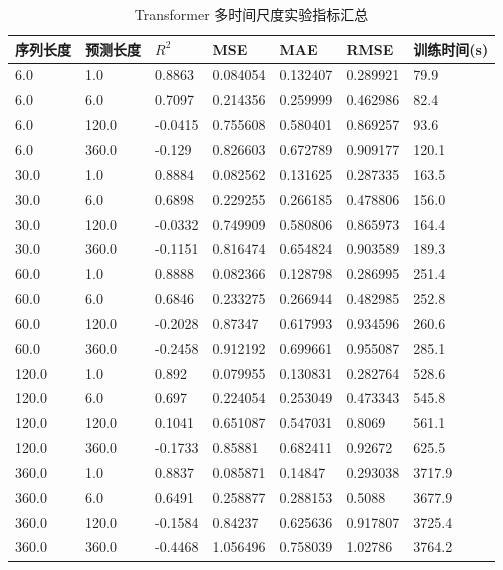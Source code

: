 \begin{table}[htbp]
\centering
\caption{Transformer 多时间尺度实验指标汇总}
\label{tab:transformer-metrics}
\begin{tabular}{lllllll}
\hline
序列长度 & 预测长度 & $R^2$ & MSE & MAE & RMSE & 训练时间(s) \\
\hline
6.0 & 1.0 & 0.8863 & 0.084054 & 0.132407 & 0.289921 & 79.9 \\
6.0 & 6.0 & 0.7097 & 0.214356 & 0.259999 & 0.462986 & 82.4 \\
6.0 & 120.0 & -0.0415 & 0.755608 & 0.580401 & 0.869257 & 93.6 \\
6.0 & 360.0 & -0.129 & 0.826603 & 0.672789 & 0.909177 & 120.1 \\
30.0 & 1.0 & 0.8884 & 0.082562 & 0.131625 & 0.287335 & 163.5 \\
30.0 & 6.0 & 0.6898 & 0.229255 & 0.266185 & 0.478806 & 156.0 \\
30.0 & 120.0 & -0.0332 & 0.749909 & 0.580806 & 0.865973 & 164.4 \\
30.0 & 360.0 & -0.1151 & 0.816474 & 0.654824 & 0.903589 & 189.3 \\
60.0 & 1.0 & 0.8888 & 0.082366 & 0.128798 & 0.286995 & 251.4 \\
60.0 & 6.0 & 0.6846 & 0.233275 & 0.266944 & 0.482985 & 252.8 \\
60.0 & 120.0 & -0.2028 & 0.87347 & 0.617993 & 0.934596 & 260.6 \\
60.0 & 360.0 & -0.2458 & 0.912192 & 0.699661 & 0.955087 & 285.1 \\
120.0 & 1.0 & 0.892 & 0.079955 & 0.130831 & 0.282764 & 528.6 \\
120.0 & 6.0 & 0.697 & 0.224054 & 0.253049 & 0.473343 & 545.8 \\
120.0 & 120.0 & 0.1041 & 0.651087 & 0.547031 & 0.8069 & 561.1 \\
120.0 & 360.0 & -0.1733 & 0.85881 & 0.682411 & 0.92672 & 625.5 \\
360.0 & 1.0 & 0.8837 & 0.085871 & 0.14847 & 0.293038 & 3717.9 \\
360.0 & 6.0 & 0.6491 & 0.258877 & 0.288153 & 0.5088 & 3677.9 \\
360.0 & 120.0 & -0.1584 & 0.84237 & 0.625636 & 0.917807 & 3725.4 \\
360.0 & 360.0 & -0.4468 & 1.056496 & 0.758039 & 1.02786 & 3764.2 \\
\hline
\end{tabular}
\end{table}